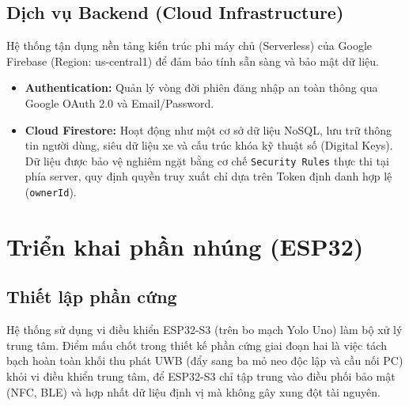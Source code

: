 \subsection{Dịch vụ Backend (Cloud Infrastructure)}
Hệ thống tận dụng nền tảng kiến trúc phi máy chủ (Serverless) của Google Firebase (Region: us-central1) để đảm bảo tính sẵn sàng và bảo mật dữ liệu.
\begin{itemize}
    \item \textbf{Authentication:} Quản lý vòng đời phiên đăng nhập an toàn thông qua Google OAuth 2.0 và Email/Password.
    \item \textbf{Cloud Firestore:} Hoạt động như một cơ sở dữ liệu NoSQL, lưu trữ thông tin người dùng, siêu dữ liệu xe và cấu trúc khóa kỹ thuật số (Digital Keys). Dữ liệu được bảo vệ nghiêm ngặt bằng cơ chế \texttt{Security Rules} thực thi tại phía server, quy định quyền truy xuất chỉ dựa trên Token định danh hợp lệ (\texttt{ownerId}).
\end{itemize}














\section{Triển khai phần nhúng (ESP32)}

\subsection{Thiết lập phần cứng}
Hệ thống sử dụng vi điều khiển ESP32-S3 (trên bo mạch Yolo Uno) làm bộ xử lý trung tâm. Điểm mấu chốt trong thiết kế phần cứng giai đoạn hai là việc tách bạch hoàn toàn khối thu phát UWB (đẩy sang ba mỏ neo độc lập và cầu nối PC) khỏi vi điều khiển trung tâm, để ESP32-S3 chỉ tập trung vào điều phối bảo mật (NFC, BLE) và hợp nhất dữ liệu định vị mà không gây xung đột tài nguyên.

